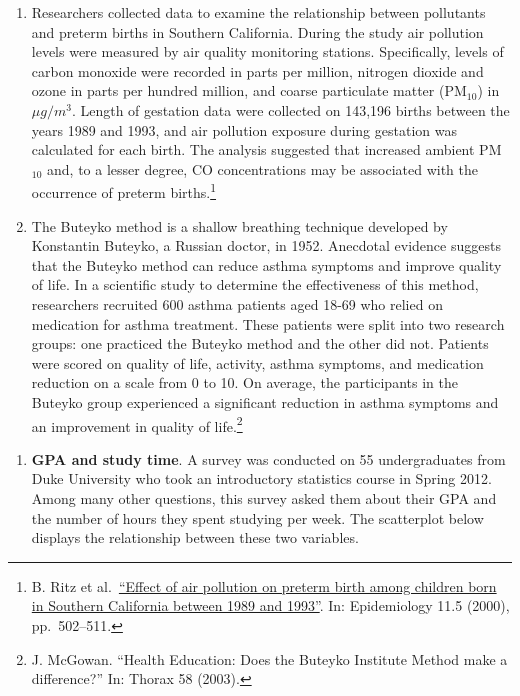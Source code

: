 \documentclass[
]{book}
\providecommand{\tightlist}{%
  \setlength{\itemsep}{0pt}\setlength{\parskip}{0pt}}
\begin{document}
\begin{enumerate}
\def\labelenumi{\alph{enumi}.}
\tightlist
\item
  Researchers collected data to examine the relationship between pollutants and preterm births in Southern California. During the study air pollution levels were measured by air quality monitoring stations. Specifically, levels of carbon monoxide were recorded in parts per million, nitrogen dioxide and ozone in parts per hundred million, and coarse particulate matter (PM\(_{10}\)) in \(\mu g/m^3\). Length of gestation data were collected on 143,196 births between the years 1989 and 1993, and air pollution exposure during gestation was calculated for each birth. The analysis suggested that increased ambient PM\(_{10}\) and, to a lesser degree, CO concentrations may be associated with the occurrence of preterm births.\footnote{B. Ritz et al.~\href{http://journals.lww.com/epidem/Abstract/2000/09000/Effect_of_Air_Pollution_on_Preterm_Birth_Among.4.aspx}{``Effect of air pollution on preterm birth among children born in Southern California
    between 1989 and 1993''}. In: Epidemiology 11.5 (2000), pp.~502--511.}\\
\item
  The Buteyko method is a shallow breathing technique developed by Konstantin Buteyko, a Russian doctor, in 1952. Anecdotal evidence suggests that the Buteyko method can reduce asthma symptoms and improve quality of life. In a scientific study to determine the effectiveness of this method, researchers recruited 600 asthma patients aged 18-69 who relied on medication for asthma treatment. These patients were split into two research groups: one practiced the Buteyko method and the other did not. Patients were scored on quality of life, activity, asthma symptoms, and medication reduction on a scale from 0 to 10. On average, the participants in the Buteyko group experienced a significant reduction in asthma symptoms and an improvement in quality of life.\footnote{J. McGowan. ``Health Education: Does the Buteyko Institute Method make a difference?'' In: Thorax 58 (2003).}
\end{enumerate}

\pagebreak

\begin{enumerate}
\def\labelenumi{\arabic{enumi}.}
\setcounter{enumi}{1}
\tightlist
\item
  \textbf{GPA and study time}. A survey was conducted on 55 undergraduates from Duke University who took an introductory statistics course in Spring 2012. Among many other questions, this survey asked them about their GPA and the number of hours they spent studying per week. The scatterplot below displays the relationship between these two variables.
\end{enumerate}
\end{document}
